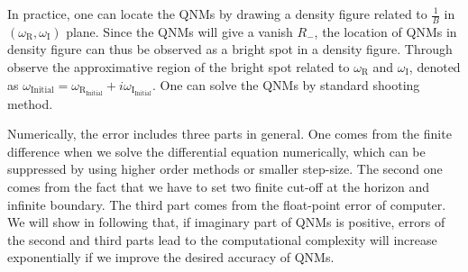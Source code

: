 \documentclass[pr, twocolumn, preprintnumbers, showpacs,footnoteadded, superscriptaddress,nofootinbib,longbibliography]{revtex4-1}
\begin{document}
%
In practice, one can locate the QNMs by drawing a density figure related to $\frac{1}{B}$ in $\left(\omega_{\text{R}}, \omega_{\text{I}} \right)$ plane. Since the QNMs will give a vanish $R_{-}$, the location of QNMs in density figure can thus be observed as a bright spot in a density figure. Through observe the approximative region of the bright spot related to $\omega_{\text{R}}$ and $\omega_{\text{I}}$, denoted as $\omega_{\text{Initial}}=\omega_{\text{R}_{\text{Initial}}} + i \omega_{\text{I}_{\text{Initial}}}$. One can solve the QNMs by standard shooting method.

Numerically, the error includes three parts in general. One comes from the finite difference when we solve the differential equation numerically, which can be suppressed by using higher order methods or smaller step-size. The second one comes from the fact that we have to set two finite cut-off at the horizon and infinite boundary. The third part comes from the float-point error of computer. We will show in following that, if imaginary part of QNMs is positive, errors of the second and third parts lead to the computational complexity will increase exponentially if we improve the desired accuracy of QNMs.
\end{document}
